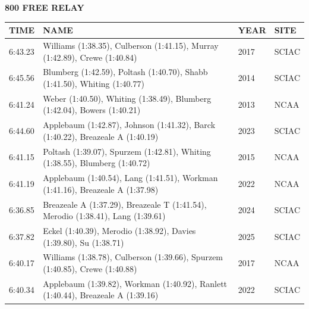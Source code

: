 \begin{table}[H]
\centering
\begin{minipage}[t]{0.6\textwidth}
\centering
\textbf{800 FREE RELAY}\\[0.1cm]
\begin{tabular}{@{}p{1.8cm}p{2.8cm}p{1.2cm}p{1.4cm}@{}}
\hline
    \textbf{TIME} & \textbf{NAME} & \textbf{YEAR} & \textbf{SITE} \\
\hline
    6:43.23 & Williams (1:38.35), Culberson (1:41.15), Murray (1:42.89), Crewe (1:40.84) & 2017 & SCIAC \\
    6:45.56 & Blumberg (1:42.59), Poltash (1:40.70), Shabb (1:41.50), Whiting (1:40.77) & 2014 & SCIAC \\
    6:41.24 & Weber (1:40.50), Whiting (1:38.49), Blumberg (1:42.04), Bowers (1:40.21) & 2013 & NCAA \\
    6:44.60 & Applebaum (1:42.87), Johnson (1:41.32), Barck (1:40.22), Breazeale A (1:40.19) & 2023 & SCIAC \\
    6:41.15 & Poltash (1:39.07), Spurzem (1:42.81), Whiting (1:38.55), Blumberg (1:40.72) & 2015 & NCAA \\
    6:41.19 & Applebaum (1:40.54), Lang (1:41.51), Workman (1:41.16), Breazeale A (1:37.98) & 2022 & NCAA \\
    6:36.85 & Breazeale A (1:37.29), Breazeale T (1:41.54), Merodio (1:38.41), Lang (1:39.61) & 2024 & SCIAC \\
    6:37.82 & Eckel (1:40.39), Merodio (1:38.92), Davies (1:39.80), Su (1:38.71) & 2025 & SCIAC \\
    6:40.17 & Williams (1:38.78), Culberson (1:39.66), Spurzem (1:40.85), Crewe (1:40.88) & 2017 & NCAA \\
    6:40.34 & Applebaum (1:39.82), Workman (1:40.92), Ranlett (1:40.44), Breazeale A (1:39.16) & 2022 & SCIAC \\
\hline
\end{tabular}
\end{minipage}
\end{table}

